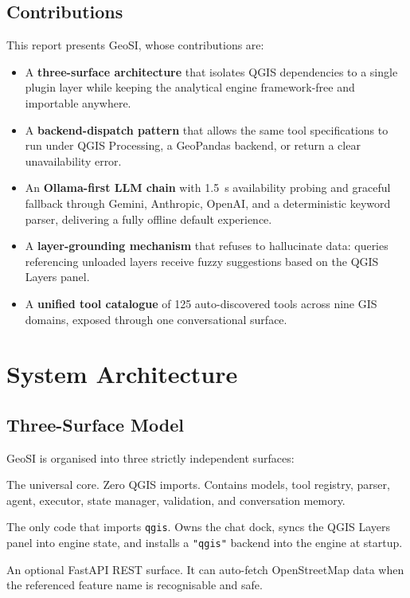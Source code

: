 \documentclass[11pt,a4paper]{article}
\begin{document}
\subsection{Contributions}
This report presents GeoSI, whose contributions are:
\begin{itemize}[leftmargin=*]
  \item A \textbf{three-surface architecture} that isolates QGIS
  dependencies to a single plugin layer while keeping the analytical
  engine framework-free and importable anywhere.
  \item A \textbf{backend-dispatch pattern} that allows the same tool
  specifications to run under QGIS Processing, a GeoPandas backend, or
  return a clear unavailability error.
  \item An \textbf{Ollama-first LLM chain} with 1.5~s availability
  probing and graceful fallback through Gemini, Anthropic, OpenAI,
  and a deterministic keyword parser, delivering a fully offline
  default experience.
  \item A \textbf{layer-grounding mechanism} that refuses to
  hallucinate data: queries referencing unloaded layers receive fuzzy
  suggestions based on the QGIS Layers panel.
  \item A \textbf{unified tool catalogue} of 125 auto-discovered tools
  across nine GIS domains, exposed through one conversational surface.
\end{itemize}

\section{System Architecture}
\subsection{Three-Surface Model}
GeoSI is organised into three strictly independent surfaces:
\begin{description}[leftmargin=*]
  \item[\texttt{geosi\_engine/}] The universal core. Zero QGIS imports.
  Contains models, tool registry, parser, agent, executor,
  state manager, validation, and conversation memory.
  \item[\texttt{geosi\_plugin/}] The only code that imports
  \texttt{qgis}. Owns the chat dock, syncs the QGIS Layers panel into
  engine state, and installs a \texttt{"qgis"} backend into the engine
  at startup.
  \item[\texttt{geosi\_server/}] An optional FastAPI REST surface. It
  can auto-fetch OpenStreetMap data when the referenced feature name
  is recognisable and safe.
\end{description}
\end{document}
